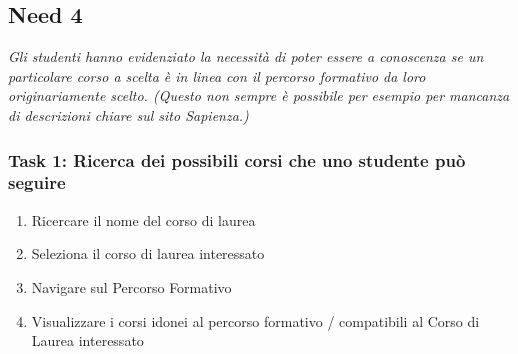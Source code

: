 \subsection{Need 4}
\begin{center}
    \textit{Gli studenti hanno evidenziato la necessità di poter essere a conoscenza se un particolare corso a scelta è in linea con il percorso formativo da loro originariamente scelto. (Questo non sempre è possibile per esempio per mancanza di descrizioni chiare sul sito Sapienza.)    }
\end{center}
\subsubsection{Task 1: Ricerca dei possibili corsi che uno studente può seguire}
\begin{enumerate}
    \item Ricercare il nome del corso di laurea
    \item Seleziona il corso di laurea interessato
    \item Navigare sul Percorso Formativo 
    \item Visualizzare i corsi idonei al percorso formativo / compatibili al Corso di Laurea interessato 
\end{enumerate}

